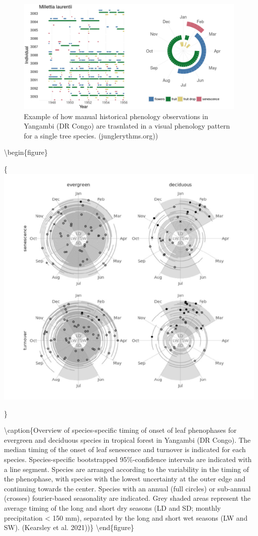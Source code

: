\documentclass[12pt,oneside]{book}
\begin{document}
\begin{figure}

{\centering \includegraphics[width=0.8\linewidth]{figures/chap4/f49_junglerythms} 

}

\caption{Example of how manual historical phenology observations in Yangambi (DR Congo) are trasnlated in a visual phenology pattern for a single tree species. (junglerythms.org))}\label{fig:f49}
\end{figure}

\textbackslash{}begin\{figure\}

\{\centering \includegraphics[width=0.8\linewidth]{figures/chap4/f410_kearsley}

\}

\textbackslash{}caption\{Overview of species-specific timing of onset of
leaf phenophases for evergreen and deciduous species in tropical forest
in Yangambi (DR Congo). The median timing of the onset of leaf
senescence and turnover is indicated for each species. Species-specific
bootstrapped 95\%-confidence intervals are indicated with a line
segment. Species are arranged according to the variability in the timing
of the phenophase, with species with the lowest uncertainty at the outer
edge and continuing towards the center. Species with an annual (full
circles) or sub-annual (crosses) fourier-based seasonality are
indicated. Grey shaded areas represent the average timing of the long
and short dry seasons (LD and SD; monthly precipitation \textless{} 150
mm), separated by the long and short wet seasons (LW and SW). (Kearsley
et al. 2021))\}\label{fig:f410} \textbackslash{}end\{figure\}
\end{document}
